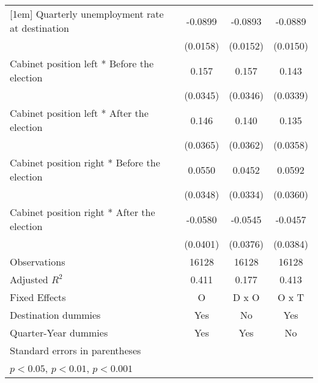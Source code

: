\begin{table}[htbp]
\begin{tabular}{l*{3}{c}}
[1em]
Quarterly unemployment rate at destination&     -0.0899\sym{***}&     -0.0893\sym{***}&     -0.0889\sym{***}\\
                    &    (0.0158)         &    (0.0152)         &    (0.0150)         \\
[1em]
Cabinet position left * Before the election&       0.157\sym{***}&       0.157\sym{***}&       0.143\sym{***}\\
                    &    (0.0345)         &    (0.0346)         &    (0.0339)         \\
[1em]
Cabinet position left * After the election&       0.146\sym{***}&       0.140\sym{***}&       0.135\sym{***}\\
                    &    (0.0365)         &    (0.0362)         &    (0.0358)         \\
[1em]
Cabinet position right * Before the election&      0.0550         &      0.0452         &      0.0592         \\
                    &    (0.0348)         &    (0.0334)         &    (0.0360)         \\
[1em]
Cabinet position right * After the election&     -0.0580         &     -0.0545         &     -0.0457         \\
                    &    (0.0401)         &    (0.0376)         &    (0.0384)         \\
\hline
Observations        &       16128         &       16128         &       16128         \\
Adjusted \(R^{2}\)  &       0.411         &       0.177         &       0.413         \\
Fixed Effects       &           O         &       D x O         &       O x T         \\
Destination dummies &         Yes         &          No         &         Yes         \\
Quarter-Year dummies&         Yes         &         Yes         &          No         \\
\hline\hline
\multicolumn{4}{l}{\footnotesize Standard errors in parentheses}\\
\multicolumn{4}{l}{\footnotesize \sym{*} \(p<0.05\), \sym{**} \(p<0.01\), \sym{***} \(p<0.001\)}\\
\end{tabular}
\end{table}
